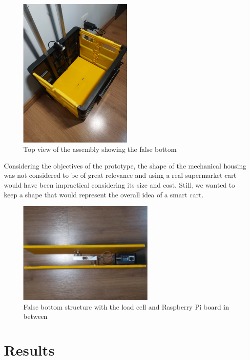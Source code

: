 \documentclass[openright]{normas-utf-tex} %
\begin{document}
\begin{figure}[H]
	\centering
	\includegraphics[width=0.5\textwidth]{./images/carttop.jpeg}
	\caption[Top view of the assembly showing the false bottom]{Top view of the assembly showing the false bottom}
\end{figure}

Considering the objectives of the prototype, the shape of the mechanical
housing was not considered to be of great relevance and using a real
supermarket cart would have been impractical considering its size and cost. Still, we wanted
to keep a shape that would represent the overall idea of a smart cart.

\begin{figure}[H]
	\centering
	\includegraphics[width=0.6\textwidth]{./images/cartbase2.jpeg}
	\caption[False bottom structure with the load cell and Raspberry Pi board in between]{False bottom structure with the load cell and Raspberry Pi board in between}
\end{figure}

\chapter{Results}
\end{document}
